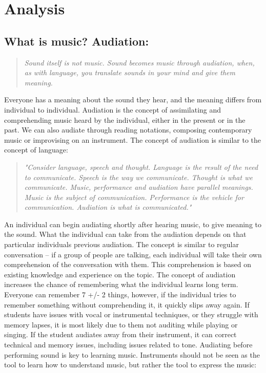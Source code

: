 \chapter{Analysis}
\section{What is music? Audiation:} 
\begin{quote}
	\textit{Sound itself is not music. Sound becomes music through audiation, when, as with language, you translate sounds in your mind and give them meaning.}\\
\end{quote}

Everyone has a meaning about the sound they hear, and the meaning differs from individual to individual. Audiation is the concept of assimilating and comprehending music heard by the individual, either in the present or in the past. We can also audiate through reading notations, composing contemporary music or improvising on an instrument.
The concept of audiation is similar to the concept of language:\\

\begin{quote}
	\textit{"Consider language, speech and thought. Language is the result of the need to communicate. Speech is the way we communicate. Thought is what we communicate. Music, performance and audiation have parallel meanings. Music is the subject of communication. Performance is the vehicle for communication. Audiation is what is communicated."}\\
\end{quote}

An individual can begin audiating shortly after hearing music, to give meaning to the sound. What the individual can take from the audiation depends on that particular individuals previous audiation. The concept is similar to regular conversation – if a group of people are talking, each individual will take their own comprehension of the conversation with them. This comprehension is based on existing knowledge and experience on the topic. 
The concept of audiation increases the chance of remembering what the individual learns long term. Everyone can remember 7 +/- 2 things, however, if the individual tries to remember something without comprehending it, it quickly slips away again. If students have issues with vocal or instrumental techniques, or they struggle with memory lapses, it is most likely due to them not auditing while playing or singing. If the student audiates away from their instrument, it can correct technical and memory issues, including issues related to tone. Audiating before performing sound is key to learning music. Instruments should not be seen as the tool to learn how to understand music, but rather the tool to express the music:\\

